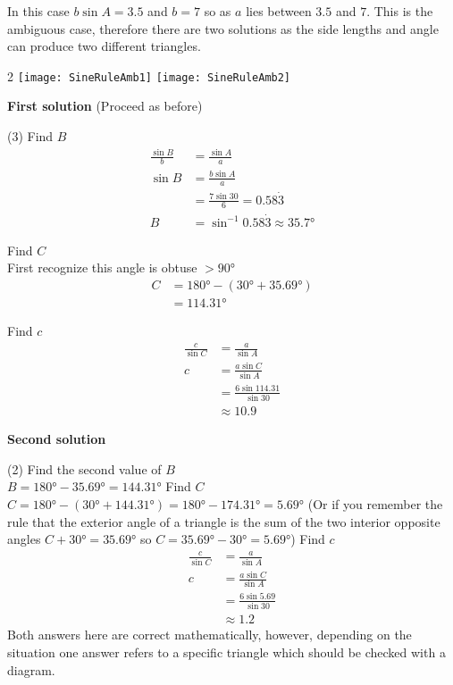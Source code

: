 \solution In this case $b \sin  A =3.5$ and $b =7$ so as $a$ lies between $3.5$ and $7$. This is the ambiguous case, therefore there are two solutions as the side lengths and angle can produce two different triangles.
\begin {multicols}{2}
\texttt{[image: SineRuleAmb1]}\columnbreak
\texttt{[image: SineRuleAmb2]}
\end {multicols}
\textbf{First solution} (Proceed as before) 
\begin{tasks}(3)
	\task Find $B$
\begin{align*}\frac{\sin  B}{b} &  = \frac{\sin  A}{a} \\
\sin  B &  = \frac{b \sin  A}{a} \\
&  = \frac{7 \sin  30 }{6} =0.58 \dot{3} \\
B &  = \sin ^{ -1} 0.58 \dot{3} \approx \ang{35.7} \end{align*}

\task Find $C$\\
First recognize this angle is obtuse $>\ang{90}$
\begin{align*}C &  = \ang{180}  -(\ang{30}  +\ang{35.69} ) \\
&  = \ang{114.31} \end{align*} 

\task Find $c$
\begin{align*}\frac{c}{\sin  C} &  = \frac{a}{\sin  A} \\
c &  = \frac{a \sin  C}{\sin  A} \\
&  = \frac{6 \sin  114.31 }{\sin  30 } \\
&  \approx   10.9\end{align*}
\end{tasks}
\textbf{Second solution} 
\begin{tasks}(2)
	\task Find the second value of $B$ \\
$B =\ang{180}  -\ang{35.69}  =\ang{144.31} $
\task Find $C$\\
$C =\ang{180} -(\ang{30}  +\ang{144.31} ) =\ang{180}  -\ang{174.31}  =\ang{5.69} $
\task*[](Or if you remember the rule that the exterior angle of a triangle is the sum of the two interior opposite angles $C +\ang{30}  =\ang{35.69} $ so $C =\ang{35.69}  -\ang{30}  =\ang{5.69} $) 
\task[(3)] Find $c$
\begin{align*}\frac{c}{\sin  C} &  = \frac{a}{\sin  A} \\
c &  = \frac{a \sin  C}{\sin  A} \\
&  = \frac{6 \sin  5.69 }{\sin  30 } \\
&  \approx   1.2\end{align*}
\task[]Both answers here are correct mathematically, however, depending on the situation one answer refers to a specific triangle which should be checked with a diagram.
\end{tasks}


